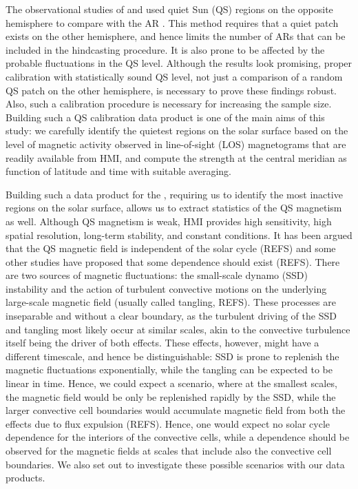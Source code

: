 \documentclass{aa}
\begin{document}
The observational studies of \cite{SRB16} and \cite{Waidele22} used quiet Sun (QS)
regions on the opposite hemisphere to compare with the AR \fff. This method
requires that a quiet patch exists on the other hemisphere, and hence 
limits the number of ARs that can be included in the hindcasting procedure. It is
also prone to be affected by the probable fluctuations in the QS
\fff level. Although the results look promising, proper calibration with
statistically sound QS level, not just a comparison of a random QS patch on the
other hemisphere, is necessary to prove these findings robust. Also,
such a calibration procedure is necessary for increasing the sample size. 
Building such a QS calibration data product is one of the main aims of this
study: we carefully identify the quietest regions on the solar surface based on the level of magnetic activity observed in
line-of-sight (LOS) magnetograms that are readily available from HMI, and
compute the \fff  strength at the central meridian as function of latitude
and time with suitable averaging. 

Building such a data product for the \fff, requiring us to identify the most
inactive regions on the solar surface, allows us to extract statistics
of the QS magnetism as well. 
Although QS magnetism is weak, HMI provides high sensitivity, high spatial
resolution, long-term stability, and constant conditions.
It has been argued that the QS magnetic field is 
independent of the solar cycle (REFS) and some other studies have proposed
that some dependence should exist (REFS). There are two sources of magnetic
fluctuations: the small-scale dynamo (SSD) instability and the action of turbulent
convective motions on the underlying large-scale magnetic field (usually
called tangling, REFS). These processes are inseparable and without a clear boundary, 
as the turbulent driving of the SSD and tangling most likely occur at similar
scales, akin to the convective turbulence itself being the driver of both
effects. These effects, however, might have a different timescale, and hence
be distinguishable: SSD is prone to replenish the magnetic fluctuations 
exponentially, while the tangling can be expected to be linear in time.  
Hence, we could expect a scenario, where at the smallest scales, the magnetic
field would be only be replenished rapidly by the SSD, while the larger
convective cell boundaries would accumulate magnetic field from both the
 effects due to flux expulsion (REFS). Hence, one would expect no solar cycle
 dependence for the interiors of the convective cells, while a dependence
  should be observed for the magnetic fields at scales that include also
  the convective cell boundaries. We also set out to investigate these
  possible scenarios with our data products. 
\end{document}

